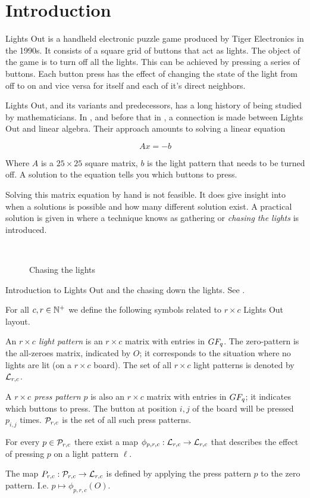 \section{Introduction}
Lights Out is a handheld electronic puzzle game produced by Tiger Electronics in
the 1990s. It consists of a square grid of buttons that act as lights. The
object of the game is to turn off all the lights. This can be achieved by
pressing a series of buttons. Each button press has the effect of changing the
state of the light from off to on and vice versa for itself and each of it's
direct neighbors.

Lights Out, and its variants and predecessors, has a long history of
being studied by mathematicians. In \cite{anderson98}, and before that in
\cite{pelletier87}, a connection is made between Lights Out and linear algebra.
Their approach amounts to solving a linear equation

\[
Ax=-b
\]

Where $A$ is a $25\times 25$ square matrix, $b$ is the light pattern that needs
to be turned off. A solution to the equation tells you which buttons to press.

Solving this matrix equation by hand is not feasible. It does give insight into
when a solutions is possible and how many different solution exist. A practical
solution is given in \cite{martin01} where a technique knows as gathering or
\emph{chasing the lights} is introduced.

\begin{figure}
  \mbox{
    \hfill
  }
  \caption{Chasing the lights}
\end{figure}


Introduction to Lights Out and the chasing down the lights. See \cite{martin01}.

\begin{definition}
  For all $c,r\in\mathbb{N}^{+}$ we define the following symbols related to
  $r \times c$ Lights Out layout.

  An {\it $r\times c$ light pattern} is an $r\times c$ matrix
  with entries in $GF_q$. The zero-pattern is the all-zeroes
  matrix, indicated by $O$; it corresponds to the situation
  where no lights are lit (on a $r\times c$ board).
  The set of all $r\times c$ light patterns is denoted by $\mathcal{L}_{r,c}$.

  A {\it $r\times c$ press pattern $p$} is also an $r\times c$ matrix
  with entries in $GF_q$; it indicates which buttons to press. The
  button at position $i, j$ of the board will be pressed $p_{i,j}$
  times. $\mathcal{P}_{r,c}$ is the set of all such press patterns.

  For every $p\in\mathcal{P}_{r,c}$ there exist a map $\phi_{p,r,c} : \mathcal{L}_{r,c}
  \rightarrow \mathcal{L}_{r,c}$ that describes the effect of pressing $p$ on
  a light pattern $\ell$.

  The map $P_{r,c} : \mathcal{P}_{r,c} \rightarrow \mathcal{L}_{r,c}$ is defined by
  applying the press pattern $p$ to the zero pattern. I.e.
  $p \mapsto \phi_{p,r,c}(O)$.
\end{definition}
